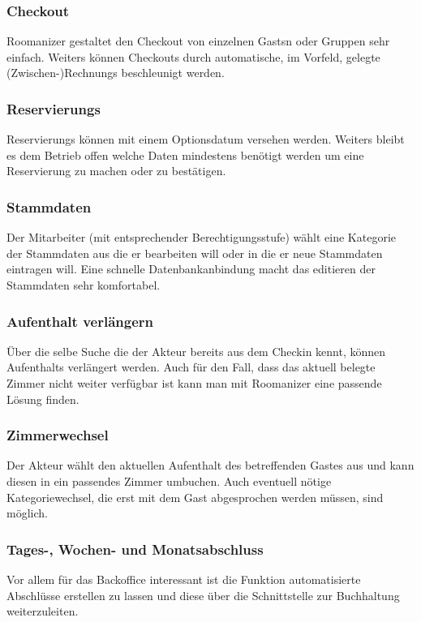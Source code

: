 \documentclass[10pt,a4paper,titlepage]{article}
\begin{document}
\subsubsection{\Gls{Checkout}}
Roomanizer gestaltet den \Gls{Checkout} von einzelnen \Glspl{Gast}n oder Gruppen sehr einfach. Weiters können \Glspl{Checkout} durch automatische, im Vorfeld, gelegte (Zwischen-)\Glspl{Rechnung} beschleunigt werden.

\subsubsection{\Glspl{Reservierung}}
\Glspl{Reservierung} können mit einem \Gls{Optionsdatum} versehen werden. Weiters bleibt es dem Betrieb offen welche Daten mindestens benötigt werden um eine \Gls{Reservierung} zu machen oder zu bestätigen.

\subsubsection{\Gls{Stammdaten}}
Der \Gls{Mitarbeiter} (mit entsprechender Berechtigungsstufe) wählt eine Kategorie der \Gls{Stammdaten} aus die er bearbeiten will oder in die er neue \Gls{Stammdaten} eintragen will. Eine schnelle Datenbankanbindung macht das editieren der \Gls{Stammdaten} sehr komfortabel.

\subsubsection{\Gls{Aufenthalt} verlängern}
Über die selbe Suche die der Akteur bereits aus dem \Gls{Checkin} kennt, können \Glspl{Aufenthalt} verlängert werden. Auch für den Fall, dass das aktuell belegte \Gls{Zimmer} nicht weiter verfügbar ist kann man mit Roomanizer eine passende Lösung finden. 

\subsubsection{Zimmerwechsel}
Der Akteur wählt den aktuellen \Gls{Aufenthalt} des betreffenden \Gls{Gast}es aus und kann diesen in ein passendes \Gls{Zimmer} umbuchen. Auch eventuell nötige Kategoriewechsel, die erst mit dem \Gls{Gast} abgesprochen werden müssen, sind möglich.

\subsubsection{Tages-, Wochen- und Monatsabschluss}
Vor allem für das \Gls{Backoffice} interessant ist die Funktion automatisierte Abschlüsse erstellen zu lassen und diese über die Schnittstelle zur Buchhaltung weiterzuleiten.
\end{document}
